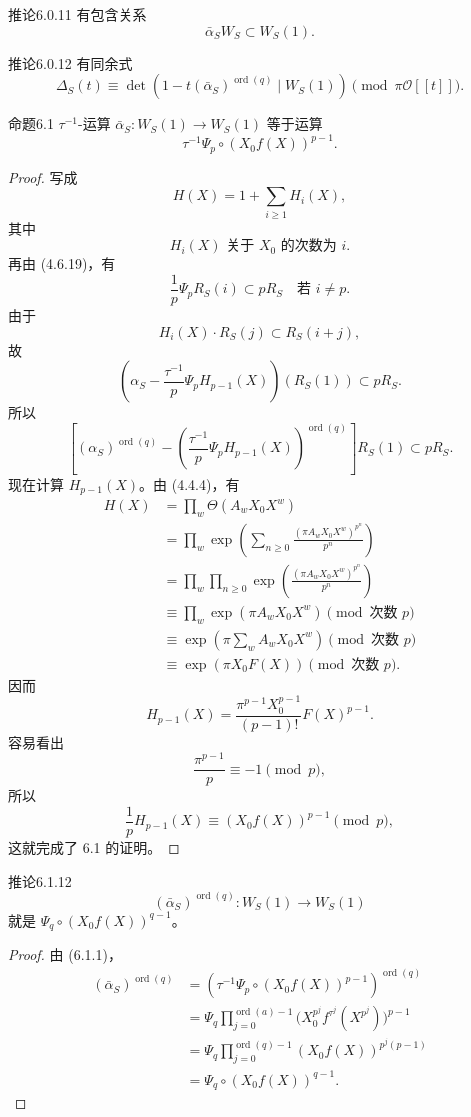 \begin{SGAresult}{推论}{6.0.11}
有包含关系
\[
\bar\alpha_SW_S\subset W_S(1).
\]
\end{SGAresult}
\begin{SGAresult}{推论}{6.0.12}
有同余式
\[
\Delta_S(t)\equiv\det(1-t(\bar\alpha_S)^{\operatorname{ord}(q)}\mid W_S(1))
\pmod{\pi\mathscr O[[t]]}.
\]
\end{SGAresult}
\begin{SGAresult}{命题}{6.1}
$\tau^{-1}$-运算 $\bar\alpha_S:W_S(1)\to W_S(1)$ 等于运算
\[
\tau^{-1}\Psi_p\circ(X_0f(X))^{p-1}.\tag{6.1.1}
\]
\end{SGAresult}
\begin{proof}
写成
\[
H(X)=1+\sum_{i\ge1}H_i(X),\tag{6.1.2}
\]
其中
\[
H_i(X)\text{ 关于 }X_0\text{ 的次数为 }i.\tag{6.1.3}
\]
再由 (4.6.19)，有
\[
\frac1p\Psi_pR_S(i)\subset pR_S\quad\text{若 }i\ne p.\tag{6.1.4}
\]
由于
\[
H_i(X)\cdot R_S(j)\subset R_S(i+j),\tag{6.1.5}
\]
故
\[
\left(\alpha_S-\frac{\tau^{-1}}p\Psi_pH_{p-1}(X)\right)(R_S(1))\subset pR_S.\tag{6.1.6}
\]
所以
\[
\left[(\alpha_S)^{\operatorname{ord}(q)}-
\left(\frac{\tau^{-1}}p\Psi_pH_{p-1}(X)\right)^{\operatorname{ord}(q)}\right]R_S(1)
\subset pR_S.\tag{6.1.7}
\]
现在计算 $H_{p-1}(X)$。由 (4.4.4)，有
\[
\begin{aligned}
H(X)&=\prod_w\Theta(A_wX_0X^w)\\
&=\prod_w\exp\left(\sum_{n\ge0}\frac{(\pi A_wX_0X^w)^{p^n}}{p^n}\right)\\
&=\prod_w\prod_{n\ge0}\exp\left(\frac{(\pi A_wX_0X^w)^{p^n}}{p^n}\right)\\
&\equiv\prod_w\exp(\pi A_wX_0X^w)\pmod{\text{次数 }p}\\
&\equiv\exp\left(\pi\sum_wA_wX_0X^w\right)\pmod{\text{次数 }p}\\
&\equiv\exp(\pi X_0F(X))\pmod{\text{次数 }p}.
\end{aligned}\tag{6.1.8}
\]
因而
\[
H_{p-1}(X)=\frac{\pi^{p-1}X_0^{p-1}}{(p-1)!}F(X)^{p-1}.\tag{6.1.9}
\]
容易看出
\[
\frac{\pi^{p-1}}p\equiv-1\pmod p,\tag{6.1.10}
\]
所以
\[
\frac1pH_{p-1}(X)\equiv(X_0f(X))^{p-1}\pmod p,\tag{6.1.11}
\]
这就完成了 6.1 的证明。
\end{proof}
\begin{SGAresult}{推论}{6.1.12}
\[
(\bar\alpha_S)^{\operatorname{ord}(q)}:W_S(1)\longrightarrow W_S(1)
\]
就是 $\Psi_q\circ(X_0f(X))^{q-1}$。
\end{SGAresult}
\begin{proof}
由 (6.1.1)，
\[
\begin{aligned}
(\bar\alpha_S)^{\operatorname{ord}(q)}
&=(\tau^{-1}\Psi_p\circ(X_0f(X))^{p-1})^{\operatorname{ord}(q)}\\
&=\Psi_q\prod_{j=0}^{\operatorname{ord}(a)-1}
\bigl(X_0^{p^j}f^{\tau^j}(X^{p^j})\bigr)^{p-1}\\
&=\Psi_q\prod_{j=0}^{\operatorname{ord}(q)-1}(X_0f(X))^{p^j(p-1)}\\
&=\Psi_q\circ(X_0f(X))^{q-1}.
\end{aligned}
\]
\end{proof}
